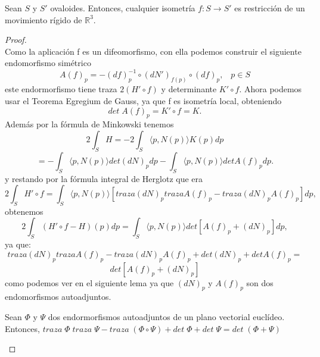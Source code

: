 \begin{teorema} \label{teo:cohn}
	Sean $S$ y $S'$ ovaloides. Entonces, cualquier isometría $f : S \to S'$ es restricción de un movimiento rígido de $\mathbb{R}^3$.
\end{teorema}

\begin{proof}
	${ }$\\
	
	Como la aplicación f es un difeomorfismo, con ella podemos construir el siguiente endomorfismo simétrico
	${ }$\\
	\[
		A(f)_p = -(df)^{-1}_{p} \circ (dN')_{f(p)} \circ (df)_p, \;\;\; p \in S
	\]
	${ }$\\
	este endormorfismo tiene traza $2(H' \circ f)$ y determinante $K' \circ f$. Ahora podemos usar el Teorema Egregium de Gauss, ya que f es isometría local, obteniendo
	${ }$\\
	\[
		det \; A(f)_p = K' \circ f = K.
	\]
	${ }$\\
	Además por la fórmula de Minkowski tenemos
	${ }$\\
	\[
		2 \int_S H = -2 \int_S \langle p, N(p) \rangle K(p) dp
	\]
	\[
		= - \int_S \langle p, N(p) \rangle det(dN)_p dp - \int_S \langle p, N(p) \rangle det A(f)_p dp.
	\]
	${ }$\\
	y restando por la fórmula integral de Herglotz que era
	${ }$\\
	\[
		2 \int_S H' \circ f = \int_S \langle p, N(p) \rangle [traza(dN)_p trazaA(f)_p - traza(dN)_p A(f)_p] dp,
	\]
	${ }$\\
	obtenemos
	${ }$\\
	\[
		2 \int_S (H' \circ f - H)(p) dp = \int_S \langle p, N(p) \rangle det[A(f)_p + (dN)_p] dp,
	\]
	${ }$\\
	ya que:
	${ }$\\
	$$traza(dN)_p trazaA(f)_p - traza(dN)_p A(f)_p + det(dN)_p + det A(f)_p =$$
	$$ det[A(f)_p + (dN)_p] $$
	${ }$\\
	como podemos ver en el siguiente lema ya que $(dN)_p$ y $A(f)_p$ son dos endomorfismos autoadjuntos.
${ }$\\

	\begin{lema}
		Sean $\Phi$ y $\Psi$ dos endormorfismos autoadjuntos de un plano vectorial euclídeo. Entonces, $traza \; \Phi \; traza \; \Psi - traza \; (\Phi \circ \Psi) + det \; \Phi + det \; \Psi = det \; (\Phi + \Psi)$
	\end{lema}
	

\end{proof}
